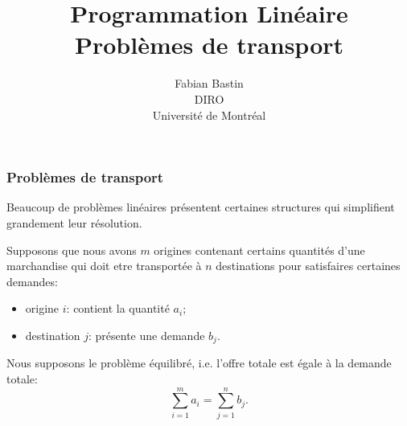 \documentclass[usepdftitle=false, aspectratio=169]{beamer}
\title[Transport]{Programmation Linéaire\\Problèmes de transport}
\author[Fabian Bastin]{Fabian Bastin\\DIRO\\Université de Montréal}
\date{}
\begin{document}
\frame{\titlepage}


\begin{frame}
\frametitle{Problèmes de transport}

Beaucoup de problèmes linéaires présentent certaines structures qui simplifient grandement leur résolution.

\mbox{}

Supposons que nous avons $m$ origines contenant certains quantités d'une marchandise qui doit etre transportée à $n$ destinations pour satisfaires certaines demandes:
\begin{itemize}
\item
origine $i$: contient la quantité $a_i$;
\item
destination $j$: présente une demande $b_j$.
\end{itemize}

\mbox{}

Nous supposons le problème équilibré, i.e. l'offre totale est égale à la demande totale:
\[
\sum_{i = 1}^m a_i = \sum_{j = 1}^n b_j.
\]

\end{frame}
\end{document}
